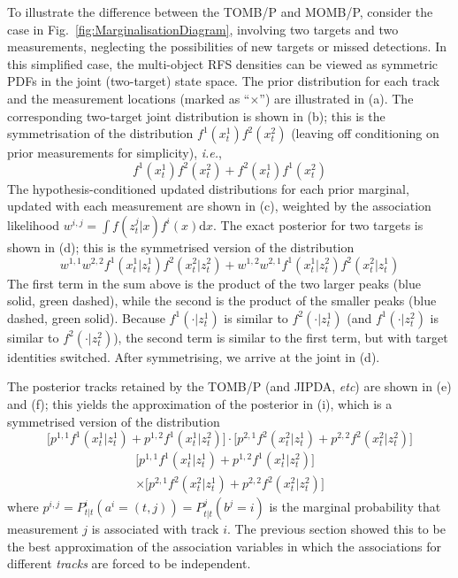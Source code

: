 \documentclass[journal,twoside]{IEEEtran}
\theoremstyle{plain}
\begin{document}
To illustrate the difference between the TOMB/P and MOMB/P, consider the case in Fig.~\ref{fig:MarginalisationDiagram}, involving two targets and two measurements, neglecting the possibilities of new targets or missed detections. In this simplified case, the multi-object RFS densities can be viewed as symmetric PDFs in the joint (two-target) state space. The prior distribution for each track and the measurement locations (marked as ``{\color{magenta}$\times$}'') are illustrated in (a). The corresponding two-target joint distribution is shown in (b); this is the symmetrisation of the distribution $f^1(x_t^1)f^2(x_t^2)$ (leaving off conditioning on prior measurements for simplicity), \textit{i.e.}\xspace,
%
\[
f^1(x_t^1)f^2(x_t^2) + f^2(x_t^1)f^1(x_t^2)
\]
%
The hypothesis-conditioned updated distributions for each prior marginal, updated with each measurement are shown in (c), weighted by the association likelihood $w^{i,j}=\int{f(z_t^j|x)f^i(x)\mathrm{d} x}$. The exact posterior for two targets is shown in (d); this is the symmetrised version of the distribution 
%
\[
w^{1,1}w^{2,2}f^1(x_t^1|z_t^1)f^2(x_t^2|z_t^2) + w^{1,2}w^{2,1}f^1(x_t^1|z_t^2)f^2(x_t^2|z_t^1)
\]
%
The first term in the sum above is the product of the two larger peaks (blue solid, green dashed), while the second is the product of the smaller peaks (blue dashed, green solid). Because $f^1(\cdot|z_t^1)$ is similar to $f^2(\cdot|z_t^1)$ (and $f^1(\cdot|z_t^2)$ is similar to $f^2(\cdot|z_t^2)$), the second term is similar to the first term, but with target identities switched. After symmetrising, we arrive at the joint in (d).

The posterior tracks retained  by the TOMB/P (and JIPDA, \textit{etc}\xspace) are shown in (e) and (f); this yields the approximation of the posterior in (i), which is a symmetrised version of the distribution
%
\ifCLASSOPTIONdraftcls
\[
\big[p^{1,1}f^1(x_t^1|z_t^1) + p^{1,2}f^1(x_t^1|z_t^2)\big]\cdot
\big[p^{2,1}f^2(x_t^2|z_t^1) + p^{2,2}f^2(x_t^2|z_t^2)\big]
\]
\else
\begin{multline*}
\big[p^{1,1}f^1(x_t^1|z_t^1) + p^{1,2}f^1(x_t^1|z_t^2)\big] \\
\times \big[p^{2,1}f^2(x_t^2|z_t^1) + p^{2,2}f^2(x_t^2|z_t^2)\big]
\end{multline*}
\fi
%
where $p^{i,j}=P_{t|t}^i(a^i=(t,j))=P_{t|t}^j(b^j=i)$ is the marginal probability that measurement $j$ is associated with track $i$. The previous section showed this to be the best approximation of the association variables in which the associations for different \emph{tracks} are forced to be independent. 
\end{document}
